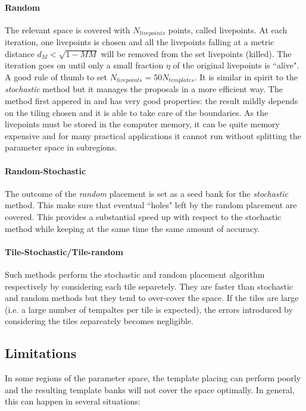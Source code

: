 \documentclass[twocolumn,showpacs,preprintnumbers,nofootinbib,prd,
superscriptaddress,10pt]{revtex4-2}
\begin{document}
\paragraph{Random}\label{par:random}
The relevant space is covered with $N_{livepoints}$ points, called livepoints. At each iteration, one livepoints is chosen and all the livepoints falling at a metric distance $d_M<\sqrt{1-MM}$ will be removed from the set livepoints (killed). The iteration goes on until only a small fraction $\eta$ of the original livepoints is ``alive". A good rule of thumb to set $N_{livepoints} = 50 N_{templates}$.
It is similar in spirit to the {\it stochastic} method but it manages the proposals in a more efficient way.
The method first appered in \cite{} and has very good properties: the result mildly depends on the tiling chosen and it is able to take care of the boundaries. As the livepoints must be stored in the computer memory, it can be quite memory expensive and for many practical applications it cannot run without splitting the parameter space in subregions.
\paragraph{Random-Stochastic}\label{par:randomstochastic}
The outcome of the {\it random} placement is set as a seed bank for the {\it stochastic} method. This make sure that eventual ``holes" left by the random placement are covered. This provides a substantial speed up with respect to the stochastic method while keeping at the same time the same amount of accuracy.
\paragraph{Tile-Stochastic/Tile-random}\label{par:tilerandom_stochastic}
Such methods perform the stochastic and random placement algorithm respectively by considering each tile separetely.
They are faster than stochastic and random methods but they tend to over-cover the space. If the tiles are large (i.e. a large number of tempaltes per tile is expected), the errors introduced by considering the tiles separeately becomes negligible.

\subsection{Limitations} \label{sec:limitations}

In some regions of the parameter space, the template placing can perform poorly and the resulting template banks will not cover the space optimally.
In general, this can happen in several situations:
\end{document}
